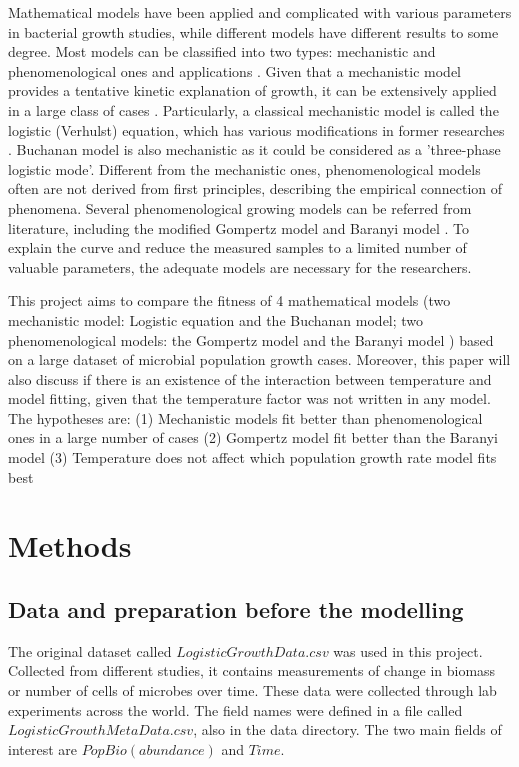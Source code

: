 \documentclass[11pt]{article}
\begin{document}
Mathematical models have been applied and complicated with various parameters in bacterial growth studies, while different models have different results to some degree. Most models can be classified into two types: mechanistic and phenomenological ones and applications \citep{R6}. Given that a mechanistic model provides a tentative kinetic explanation of growth, it can be extensively applied in a large class of cases \citep{R12}. Particularly, a classical mechanistic model is called the logistic (Verhulst) equation, which has various modifications in former researches \citep{R12, R11, R13}.  Buchanan model \citep{R16} is also mechanistic as it could be considered as a 'three-phase logistic mode'. Different from the mechanistic ones, phenomenological models often are not derived from first principles, describing the empirical connection of phenomena. Several phenomenological growing models can be referred from literature, including the modified Gompertz model \citep{R10} and Baranyi model \citep{R14, R15}. To explain the curve and reduce the measured samples to a limited number of valuable parameters, the adequate models are necessary for the researchers. 

This project aims to compare the fitness of 4 mathematical models (two mechanistic model: Logistic equation and the Buchanan model; two phenomenological models: the Gompertz model and the Baranyi model ) based on a large dataset of microbial population growth cases. Moreover, this paper will also discuss if there is an existence of the interaction between temperature and model fitting, given that the temperature factor was not written in any model. The hypotheses are:
(1) Mechanistic models fit better than phenomenological ones in a large number of cases
(2) Gompertz model fit better than the Baranyi model  
(3) Temperature does not affect which population growth rate model fits best

		
\section{Methods}
\subsection{Data and preparation before the modelling }
The original dataset called $LogisticGrowthData.csv$ was used in this project. Collected from different studies, it contains measurements of change in biomass or number of cells of microbes over time. These data were collected through lab experiments across the world. The field names were defined in a file called $LogisticGrowthMetaData.csv$, also in the data directory. The two main fields of interest are $PopBio (abundance)$ and $Time$. 
\end{document}
